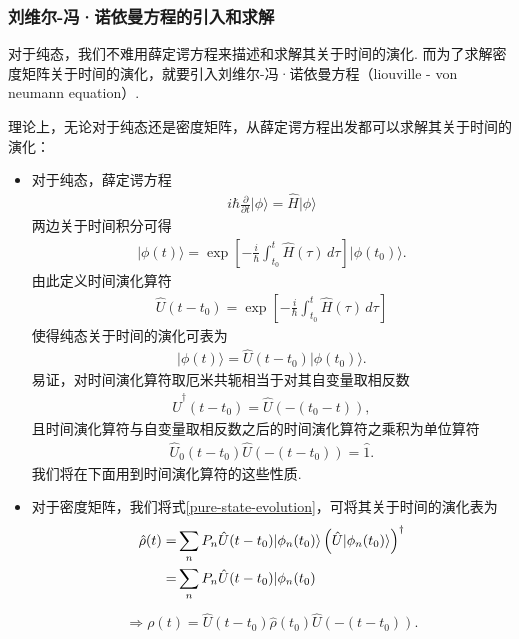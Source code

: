 \documentclass{assignment}
\begin{document}
\subsubsection{刘维尔-冯·诺依曼方程的引入和求解}
对于纯态，我们不难用薛定谔方程来描述和求解其关于时间的演化. 而为了求解密度矩阵关于时间的演化，就要引入刘维尔-冯·诺依曼方程（liouville - von neumann equation）.

理论上，无论对于纯态还是密度矩阵，从薛定谔方程出发都可以求解其关于时间的演化：
\begin{itemize}
    \item 对于纯态，薛定谔方程
    \begin{align}
        i\hbar\frac{\partial}{\partial t}\lvert\phi\rangle=\hat{H}\lvert\phi\rangle
    \end{align}
    两边关于时间积分可得
    \begin{align}
        \lvert\phi(t)\rangle=\exp\left[-\frac{i}{\hbar}\int_{t_0}^t\hat{H}(\tau)\,d\tau\right]\lvert\phi(t_0)\rangle.
    \end{align}
    由此定义时间演化算符
    \begin{align}
        \hat{U}(t-t_0)=\exp\left[-\frac{i}{\hbar}\int_{t_0}^t\hat{H}(\tau)\,d\tau\right]
    \end{align}
    使得纯态关于时间的演化可表为
    \begin{align}
        \label{pure-state-evolution}
        \boxed{\lvert\phi(t)\rangle=\hat{U}(t-t_0)\lvert\phi(t_0)\rangle.}
    \end{align}
    易证，对时间演化算符取厄米共轭相当于对其自变量取相反数
    \begin{align}
        \hat{U}^{\dagger}(t-t_0)=\hat{U}(-(t_0-t)),
    \end{align}
    且时间演化算符与自变量取相反数之后的时间演化算符之乘积为单位算符
    \begin{align}
        \hat{U}_0(t-t_0)\hat{U}(-(t-t_0))=\hat{1}.
    \end{align}
    我们将在下面用到时间演化算符的这些性质.
    \item 对于密度矩阵，我们将式\eqref{pure-state-evolution}，可将其关于时间的演化表为
    \begin{align}
        \notag\hat{\rho}(t)=&\sum_nP_n\hat{U}(t-t_0)\lvert\phi_n(t_0)\rangle\left(\hat{U}\lvert\phi_n(t_0)\rangle\right)^{\dagger}\\
        \notag=&\sum_nP_n\hat{U}(t-t_0)\lvert\phi_n(t_0)
    \end{align}
    \begin{align}
        \label{mixture-state-evolution}
        \Longrightarrow\boxed{\rho(t)=\hat{U}(t-t_0)\hat{\rho}(t_0)\hat{U}(-(t-t_0)).}
    \end{align}
\end{itemize}
\end{document}
